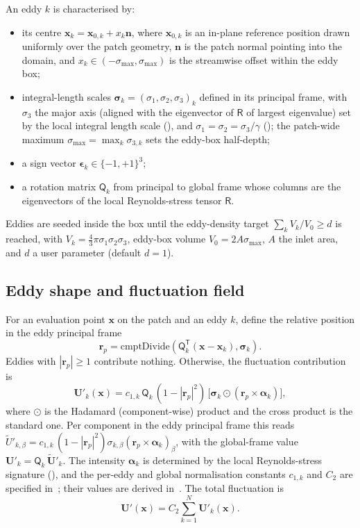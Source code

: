 \documentclass[
 amsmath,amssymb,
 aps,
 twocolumn,
]{revtex4-2}
\renewcommand{\vec}[1]{\boldsymbol{#1}}
\newcommand{\bR}{\mathsf{R}}
\newcommand{\bQ}{\mathsf{Q}}
\begin{document}
An eddy $k$ is characterised by:
\begin{itemize}[noitemsep]
  \item its centre $\vec x_k = \vec x_{0,k} + x_k\vec n$, where
    $\vec x_{0,k}$ is an in-plane reference position drawn uniformly over
    the patch geometry, $\vec n$ is the patch normal pointing into the
    domain, and $x_k\in(-\sigma_{\max},\sigma_{\max})$ is the
    streamwise offset within the eddy box;
  \item integral-length scales
    $\vec\sigma_k=(\sigma_1,\sigma_2,\sigma_3)_k$ defined in its principal
    frame, with $\sigma_3$ the major axis (aligned with the eigenvector
    of $\bR$ of largest eigenvalue) set by the local integral length
    scale (), and $\sigma_1=\sigma_2=\sigma_3/\gamma$
    (); the patch-wide maximum
    $\sigma_{\max}=\max_k\sigma_{3,k}$ sets the eddy-box half-depth;
  \item a sign vector $\vec\epsilon_k\in\{-1,+1\}^3$;
  \item a rotation matrix $\bQ_k$ from principal to global frame
    whose columns are the eigenvectors of the local Reynolds-stress
    tensor $\bR$.
\end{itemize}
Eddies are seeded inside the box until the eddy-density target
$\sum_k V_k / V_0 \ge d$ is reached, with
$V_k=\tfrac{4}{3}\pi\sigma_1\sigma_2\sigma_3$, eddy-box volume
$V_0 = 2A\sigma_{\max}$, $A$ the inlet area, and $d$ a user parameter
(default $d=1$).

\subsection{Eddy shape and fluctuation field}\label{sec:uprime}

For an evaluation point $\vec x$ on the patch and an eddy $k$, define the
relative position in the eddy principal frame
\begin{equation}\label{eq:rp}
  \vec r_p
  = \mathrm{cmptDivide}\!\left(\bQ_k^{\mathsf T}(\vec x-\vec x_k),
    \vec\sigma_k\right).
\end{equation}
Eddies with $|\vec r_p|\ge 1$ contribute nothing. Otherwise, the
fluctuation contribution is
\begin{equation}\label{eq:uPrime}
  \vec U'_k(\vec x)
  = c_{1,k}\,\bQ_k\,
    (1-|\vec r_p|^2)\,\bigl[\vec\sigma_k\odot(\vec r_p\times\vec\alpha_k)\bigr],
\end{equation}
where $\odot$ is the Hadamard (component-wise) product and the cross
product is the standard one. Per component in the eddy principal frame
this reads
$\tilde U'_{k,\beta}=c_{1,k}\,(1-|\vec r_p|^2)
 \sigma_{k,\beta}(\vec r_p\times\vec\alpha_k)_\beta$,
with the global-frame value $\vec U'_k=\bQ_k\,\vec{\tilde U}'_k$.
The intensity $\vec\alpha_k$ is determined by the local Reynolds-stress
signature (), and the per-eddy and global normalisation
constants $c_{1,k}$ and $C_2$ are specified in~; their
values are derived in~. The total fluctuation is
\begin{equation}\label{eq:uPrime_total}
  \vec U'(\vec x) = C_2 \sum_{k=1}^N \vec U'_k(\vec x).
\end{equation}
\end{document}
